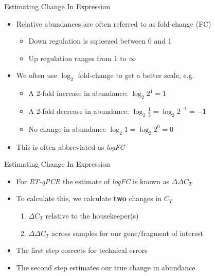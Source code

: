 \documentclass[aspectratio=169,11pt]{beamer}
\begin{document}
\begin{frame}{Estimating Change In Expression}

	\begin{itemize}
		\item Relative abundances are often referred to as fold-change (FC)
		\begin{itemize}
			\item Down regulation is squeezed between 0 and 1
			\item Up regulation ranges from 1 to $\infty$
		\end{itemize}
		
		\item We often use $\log_2$ fold-change to get a better scale, e.g. 
		\begin{itemize}
			\item A 2-fold increase in abundance: $\log_2 2^1=1$
			\item A 2-fold decrease in abundance: $\log_2 \frac{1}{2}= \log_2 2^{-1} = -1$
			\item No change in abundance $\log_2 1 = \log_2 2^0 = 0$
		\end{itemize}		 
		\item This is often abbreviated as \textit{logFC}
	\end{itemize}

\end{frame}

\begin{frame}{Estimating Change In Expression}

	\begin{itemize}
		\item For \textit{RT-qPCR} the estimate of \textit{logFC} is known as $\Delta\Delta C_T$
		\item To calculate this, we calculate \textbf{two} changes in $C_T$
		\begin{enumerate}
			\item $\Delta C_T$ relative to the housekeeper(s)
			\item $\Delta \Delta C_T$ across samples for our gene/fragment of interest 
		\end{enumerate}
		\item The first step corrects for technical errors
		\item The second step estimates our true change in abundance
	\end{itemize}

\end{frame}
\end{document}
